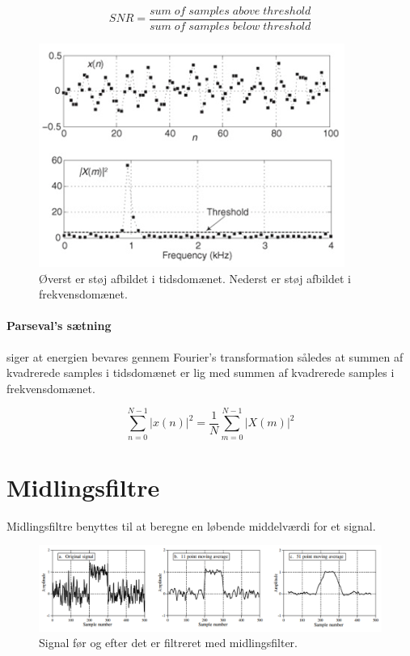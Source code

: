 \documentclass[danish]{article}
\begin{document}
\begin{equation}
SNR=  \frac{sum\;of\;samples\;above\;threshold}{sum\;of\;samples\;below\;threshold}
\end{equation}

\begin{figure} [H]
	\centering
	\includegraphics[width=0.6\linewidth]{graphics/snr}
	\caption{Øverst er støj afbildet i tidsdomænet. Nederst er støj afbildet i frekvensdomænet. }
	\label{fig:snr}
\end{figure}

\paragraph{Parseval's sætning} siger at energien bevares gennem Fourier’s transformation således at summen af kvadrerede samples i tidsdomænet er lig med summen af kvadrerede samples i frekvensdomænet.

\begin{equation}
\sum_{n=0}^{N-1}|x(n)|^2 = \frac{1}{N} \sum_{m=0}^{N-1}|X(m)|^2
\end{equation}


\newpage
\section{Midlingsfiltre}
Midlingsfiltre benyttes til at beregne en løbende middelværdi for et signal. 

\begin{figure} [H]
	\centering
	\includegraphics[width=\linewidth]{graphics/ma}
	\caption{Signal før og efter det er filtreret med midlingsfilter.}
	\label{fig:ma}
\end{figure}
\end{document}
